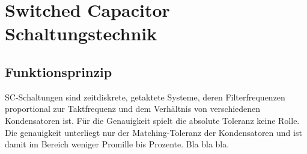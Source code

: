 \section{Switched Capacitor Schaltungstechnik}
\subsection{Funktionsprinzip}
SC-Schaltungen sind zeitdiskrete, getaktete Systeme, deren Filterfrequenzen proportional zur Taktfrequenz und dem Verhältnis von verschiedenen Kondensatoren ist.
Für die Genauigkeit spielt die absolute Toleranz keine Rolle. Die genauigkeit unterliegt nur der Matching-Toleranz der Kondensatoren und ist damit im Bereich weniger Promille bis Prozente. Bla bla bla.